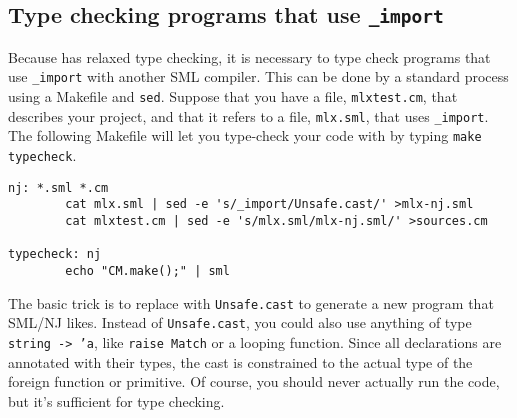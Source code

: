 \subsection{Type checking programs that use {\tt \_import}}

Because {\mlton} has relaxed type checking, it is necessary to
type check programs that use {\tt \_import} with another SML compiler.
This can be done by a standard process using a Makefile and {\tt sed}.
Suppose that you have a file, {\tt mlxtest.cm}, that describes your
{\mlton} project, and that it refers to a file, {\tt mlx.sml}, that
uses {\tt \_import}.  The following Makefile will let you type-check your
code with {\smlnj} by typing {\tt make typecheck}.

\begin{verbatim}
nj: *.sml *.cm
        cat mlx.sml | sed -e 's/_import/Unsafe.cast/' >mlx-nj.sml
        cat mlxtest.cm | sed -e 's/mlx.sml/mlx-nj.sml/' >sources.cm

typecheck: nj
        echo "CM.make();" | sml
\end{verbatim}

The basic trick is to replace {\ffi} with {\tt Unsafe.cast} to generate a new
program that SML/NJ likes.  Instead of {\tt Unsafe.cast}, you could also use
anything of type {\tt string -> 'a}, like {\tt raise Match} or a looping
function.  Since all {\ffi} declarations are annotated with their types, the
cast is constrained to the actual type of the foreign function or primitive. Of
course, you should never actually run the code, but it's sufficient for type
checking.
